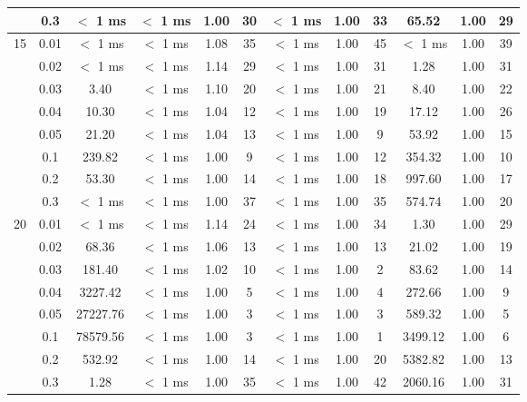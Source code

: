 \begin{tabular}{| c | c | c | c | c | c | c | c | c |  c | c | c | }
	& 0.3 & $<$ 1 ms & $<$ 1 ms & 1.00 & 30 & $<$ 1 ms & 1.00 & 33 & 65.52 & 1.00 & 29\\
	\hline
	\multirow{8}{*}{15} & 0.01 & $<$ 1 ms & $<$ 1 ms & 1.08 & 35 & $<$ 1 ms & 1.00 & 45 & $<$ 1 ms & 1.00 & 39\\
	\cline{2-12}
	& 0.02 & $<$ 1 ms & $<$ 1 ms & 1.14 & 29 & $<$ 1 ms & 1.00 & 31 & 1.28 & 1.00 & 31\\
	\cline{2-12}
	& 0.03 & 3.40 & $<$ 1 ms & 1.10 & 20 & $<$ 1 ms & 1.00 & 21 & 8.40 & 1.00 & 22\\
	\cline{2-12}
	& 0.04 & 10.30 & $<$ 1 ms & 1.04 & 12 & $<$ 1 ms & 1.00 & 19 & 17.12 & 1.00 & 26\\
	\cline{2-12}
	& 0.05 & 21.20 & $<$ 1 ms & 1.04 & 13 & $<$ 1 ms & 1.00 & 9 & 53.92 & 1.00 & 15\\
	\cline{2-12}
	& 0.1 & 239.82 & $<$ 1 ms & 1.00 & 9 & $<$ 1 ms & 1.00 & 12 & 354.32 & 1.00 & 10\\
	\cline{2-12}
	& 0.2 & 53.30 & $<$ 1 ms & 1.00 & 14 & $<$ 1 ms & 1.00 & 18 & 997.60 & 1.00 & 17\\
	\cline{2-12}
	& 0.3 & $<$ 1 ms & $<$ 1 ms & 1.00 & 37 & $<$ 1 ms & 1.00 & 35 & 574.74 & 1.00 & 20\\
	\hline
	\multirow{8}{*}{20} & 0.01 & $<$ 1 ms & $<$ 1 ms & 1.14 & 24 & $<$ 1 ms & 1.00 & 34 & 1.30 & 1.00 & 29\\
	\cline{2-12}
	& 0.02 & 68.36 & $<$ 1 ms & 1.06 & 13 & $<$ 1 ms & 1.00 & 13 & 21.02 & 1.00 & 19\\
	\cline{2-12}
	& 0.03 & 181.40 & $<$ 1 ms & 1.02 & 10 & $<$ 1 ms & 1.00 & 2 & 83.62 & 1.00 & 14\\
	\cline{2-12}
	& 0.04 & 3227.42 & $<$ 1 ms & 1.00 & 5 & $<$ 1 ms & 1.00 & 4 & 272.66 & 1.00 & 9\\
	\cline{2-12}
	& 0.05 & 27227.76 & $<$ 1 ms & 1.00 & 3 & $<$ 1 ms & 1.00 & 3 & 589.32 & 1.00 & 5\\
	\cline{2-12}
	& 0.1 & 78579.56 & $<$ 1 ms & 1.00 & 3 & $<$ 1 ms & 1.00 & 1 & 3499.12 & 1.00 & 6\\
	\cline{2-12}
	& 0.2 & 532.92 & $<$ 1 ms & 1.00 & 14 & $<$ 1 ms & 1.00 & 20 & 5382.82 & 1.00 & 13\\
	\cline{2-12}
	& 0.3 & 1.28 & $<$ 1 ms & 1.00 & 35 & $<$ 1 ms & 1.00 & 42 & 2060.16 & 1.00 & 31\\
	\hline
\end{tabular}